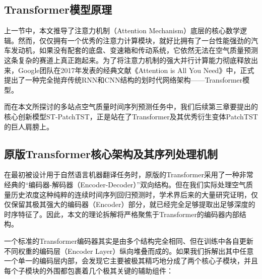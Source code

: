 \subsection{Transformer模型原理}

上一节中，本文推导了注意力机制（Attention Mechanism）底层的核心数学逻辑。然而，仅仅拥有一个优秀的注意力计算模块，就好比拥有了一台性能强劲的汽车发动机，如果没有配套的底盘、变速箱和传动系统，它依然无法在空气质量预测这条复杂的赛道上真正跑起来。为了将注意力机制的强大并行计算能力彻底释放出来，Google团队在2017年发表的经典文献《Attention is All You Need》\cite{vaswani_attention_2017}中，正式提出了一种完全抛弃传统RNN和CNN结构的划时代网络架构——Transformer模型。

而在本文所探讨的多站点空气质量时间序列预测任务中，我们后续第三章要提出的核心创新模型ST-PatchTST，正是站在了Transformer及其优秀衍生变体PatchTST的巨人肩膀上。

\subsection{原版Transformer核心架构及其序列处理机制}

在最初被设计用于自然语言机器翻译任务时，原版的Transformer采用了一种非常经典的“编码器-解码器（Encoder-Decoder）”双向结构。但在我们实际处理空气质量历史浓度这种纯粹的连续时间序列回归预测时，学术界后来的大量研究证明，仅仅保留其极其强大的编码器（Encoder）部分，就已经完全足够提取出足够深度的时序特征了。因此，本文的理论拆解将严格聚焦于Transformer的编码器内部结构。

一个标准的Transformer编码器其实是由多个结构完全相同、但在训练中各自更新不同权重的编码层（Encoder Layer）纵向堆叠而成的。如果我们拆解出其中任意一个单一的编码层内部，会发现它主要被极其精巧地分成了两个核心子模块，并且每个子模块的外围都包裹着几个极其关键的辅助组件：

